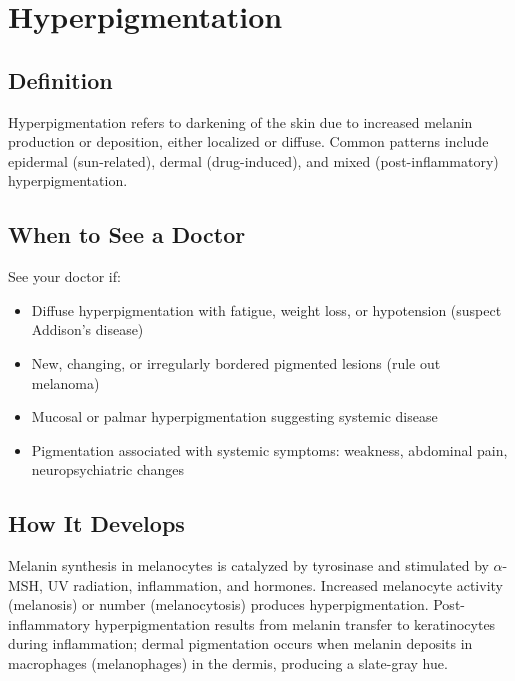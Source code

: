 \chapter{Hyperpigmentation}

\section*{Definition}
Hyperpigmentation refers to darkening of the skin due to increased melanin production or deposition, either localized or diffuse. Common patterns include epidermal (sun-related), dermal (drug-induced), and mixed (post-inflammatory) hyperpigmentation.

\section*{When to See a Doctor}
See your doctor if:
\begin{itemize}
  \item Diffuse hyperpigmentation with fatigue, weight loss, or hypotension (suspect Addison's disease)
  \item New, changing, or irregularly bordered pigmented lesions (rule out melanoma)
  \item Mucosal or palmar hyperpigmentation suggesting systemic disease
  \item Pigmentation associated with systemic symptoms: weakness, abdominal pain, neuropsychiatric changes
\end{itemize}

\section*{How It Develops}
Melanin synthesis in melanocytes is catalyzed by tyrosinase and stimulated by \ensuremath{\alpha}-MSH, UV radiation, inflammation, and hormones. Increased melanocyte activity (melanosis) or number (melanocytosis) produces hyperpigmentation. Post-inflammatory hyperpigmentation results from melanin transfer to keratinocytes during inflammation; dermal pigmentation occurs when melanin deposits in macrophages (melanophages) in the dermis, producing a slate-gray hue.

